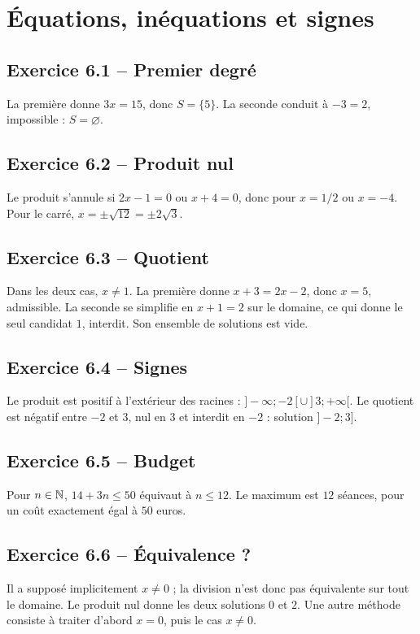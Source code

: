 \chapter{Équations, inéquations et signes}
\section*{Exercice 6.1 -- Premier degré}
La première donne $3x=15$, donc $S=\{5\}$. La seconde conduit à $-3=2$, impossible : $S=\varnothing$.

\section*{Exercice 6.2 -- Produit nul}
Le produit s'annule si $2x-1=0$ ou $x+4=0$, donc pour $x=1/2$ ou $x=-4$. Pour le carré, $x=\pm\sqrt{12}=\pm2\sqrt3$.

\section*{Exercice 6.3 -- Quotient}
Dans les deux cas, $x\ne1$. La première donne $x+3=2x-2$, donc $x=5$, admissible. La seconde se simplifie en $x+1=2$ sur le domaine, ce qui donne le seul candidat $1$, interdit. Son ensemble de solutions est vide.

\section*{Exercice 6.4 -- Signes}
Le produit est positif à l'extérieur des racines : $]-\infty;-2[\cup]3;+\infty[$. Le quotient est négatif entre $-2$ et $3$, nul en $3$ et interdit en $-2$ : solution $]-2;3]$.

\section*{Exercice 6.5 -- Budget}
Pour $n\in\mathbb{N}$, $14+3n\leq50$ équivaut à $n\leq12$. Le maximum est $12$ séances, pour un coût exactement égal à $50$ euros.

\section*{Exercice 6.6 -- Équivalence ?}
Il a supposé implicitement $x\ne0$ ; la division n'est donc pas équivalente sur tout le domaine. Le produit nul donne les deux solutions $0$ et $2$. Une autre méthode consiste à traiter d'abord $x=0$, puis le cas $x\ne0$.
